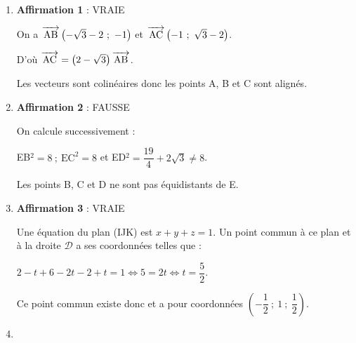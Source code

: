 \documentclass[10pt]{article}
\newcommand{\vect}[1]{\overrightarrow{\,\mathstrut#1\,}}
\newcommand{\R}{\mathbb{R}}
\def\Oijk{$\left(\text{O},~\vect{\imath},~\vect{\jmath},~\vect{k}\right)$}
\begin{document}
\begin{enumerate}
\item \textbf{Affirmation 1} : VRAIE%

On a $\vect{\text{AB}}\left(- \sqrt{3} - 2~;~- 1\right)$ et $\vect{\text{AC}}\left(- 1~;~\sqrt{3} - 2\right)$.

D'où $\vect{\text{AC}} = \left(2 - \sqrt{3}\right)\vect{\text{AB}}$.

Les vecteurs sont colinéaires donc les points A, B et C sont alignés.
\item \textbf{Affirmation 2} : FAUSSE %

On calcule successivement :

EB$^2  = 8 ~; ~ \text{EC}^2 = 8$ et ED$^2
 = \dfrac{19}{4} + 2\sqrt{3} \neq 8$.
 
 Les points B, C et D ne sont pas équidistants de E.
\item %
 

\textbf{Affirmation 3} : VRAIE %

Une équation du plan (IJK) est $x + y + z = 1$. Un  point commun à ce plan et à la droite $\mathcal{D}$ a ses coordonnées telles que :

$2 - t + 6 - 2t - 2 + t = 1 \iff 5 = 2t \iff t = \dfrac{5}{2}.$

Ce point commun existe donc et a pour coordonnées $\left(- \dfrac{1}{2}~;~1~;~\dfrac{1}{2} \right)$.
\item %

%



\end{enumerate}
\end{document}
